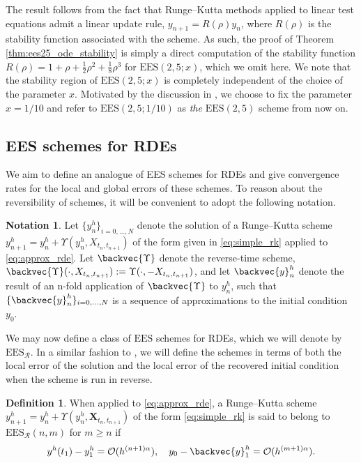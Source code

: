 \documentclass{article} %
\theoremstyle{definition}
\newtheorem{definition}{Definition}[section]
\newtheorem{notation}{Notation}[section]
\theoremstyle{remark}
\begin{document}
The result follows from the fact that Runge--Kutta methods applied to linear test equations admit a linear update rule, $y_{n+1} = R(\rho) y_n$, where $R(\rho)$ is the stability function associated with the scheme. As such, the proof of Theorem \ref{thm:ees25_ode_stability} is simply a direct computation of the stability function $R(\rho) = 1 + \rho + \frac{1}{2} \rho^2 + \frac{1}{8}\rho^3$ for $\mathrm{EES}(2,5;x)$, which we omit here. We note that the stability region of $\mathrm{EES}(2,5;x)$ is completely independent of the choice of the parameter $x$. Motivated by the discussion in \citet[Section 8.1]{shmelev2025explicit}, we choose to fix the parameter $x = 1/10$ and refer to $\mathrm{EES}(2,5;1/10)$ as \textit{the} $\mathrm{EES}(2,5)$ scheme from now on.

\subsection{EES schemes for RDEs}

We aim to define an analogue of EES schemes for RDEs and give convergence rates for the local and global errors of these schemes. To reason about the reversibility of schemes, it will be convenient to adopt the following notation.

\begin{notation}
    Let $\{y^h_n\}_{i=0, \ldots, N}$ denote the solution of a Runge--Kutta scheme $y^h_{n+1} = y^h_n + \Upsilon(y^h_n, X_{t_n, t_{n+1}})$ of the form given in \eqref{eq:simple_rk} applied to \eqref{eq:approx_rde}. Let $\backvec{\Upsilon}$ denote the reverse-time scheme, $\backvec{\Upsilon}(\cdot, X_{t_n, t_{n+1}}) := \Upsilon(\cdot, -X_{t_n, t_{n+1}})$, and let $\backvec{y}^h_n$ denote the result of an n-fold application of $\backvec{\Upsilon}$ to $y^h_n$, such that $\{\backvec{y}^h_n\}_{i=0, \ldots, N}$ is a sequence of approximations to the initial condition $y_0$.
\end{notation}

We may now define a class of $\mathrm{EES}$ schemes for RDEs, which we will denote by $\mathrm{EES}_\mathcal{R}$. In a similar fashion to \citet{shmelev2025explicit}, we will define the schemes in terms of both the local error of the solution and the local error of the recovered initial condition when the scheme is run in reverse.

\begin{definition}
    When applied to \eqref{eq:approx_rde}, a Runge--Kutta scheme $y^h_{n+1} = y^h_n + \Upsilon(y^h_n, \mathbf{X}_{t_n, t_{n+1}})$ of the form \eqref{eq:simple_rk} is said to belong to $\mathrm{EES}_\mathcal{R}(n,m)$ for $m \geq n$ if
    \begin{equation*}
        y^h(t_1) - y^h_1 = \mathcal{O}(h^{(n+1)\alpha}),\quad y_0 - \backvec{y}^h_1 = \mathcal{O}(h^{(m+1)\alpha}).
    \end{equation*}
\end{definition}
\end{document}
